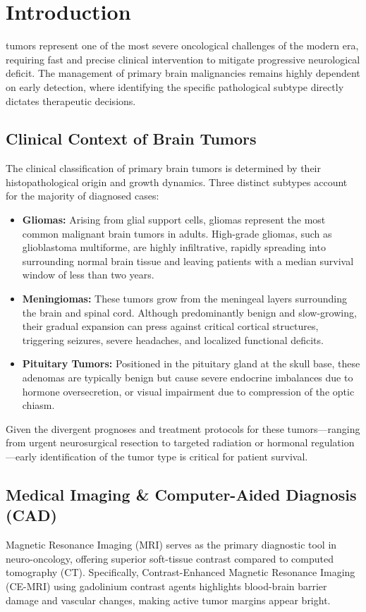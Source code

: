 \documentclass[journal,twoside]{IEEEtran}
\begin{document}
\IEEEpeerreviewmaketitle

\section{Introduction}
 tumors represent one of the most severe oncological challenges of the modern era, requiring fast and precise clinical intervention to mitigate progressive neurological deficit. The management of primary brain malignancies remains highly dependent on early detection, where identifying the specific pathological subtype directly dictates therapeutic decisions. 

\subsection{Clinical Context of Brain Tumors}
The clinical classification of primary brain tumors is determined by their histopathological origin and growth dynamics. Three distinct subtypes account for the majority of diagnosed cases:
\begin{itemize}
    \item \textbf{Gliomas:} Arising from glial support cells, gliomas represent the most common malignant brain tumors in adults. High-grade gliomas, such as glioblastoma multiforme, are highly infiltrative, rapidly spreading into surrounding normal brain tissue and leaving patients with a median survival window of less than two years.
    \item \textbf{Meningiomas:} These tumors grow from the meningeal layers surrounding the brain and spinal cord. Although predominantly benign and slow-growing, their gradual expansion can press against critical cortical structures, triggering seizures, severe headaches, and localized functional deficits.
    \item \textbf{Pituitary Tumors:} Positioned in the pituitary gland at the skull base, these adenomas are typically benign but cause severe endocrine imbalances due to hormone oversecretion, or visual impairment due to compression of the optic chiasm.
\end{itemize}
Given the divergent prognoses and treatment protocols for these tumors—ranging from urgent neurosurgical resection to targeted radiation or hormonal regulation—early identification of the tumor type is critical for patient survival.

\subsection{Medical Imaging \& Computer-Aided Diagnosis (CAD)}
Magnetic Resonance Imaging (MRI) serves as the primary diagnostic tool in neuro-oncology, offering superior soft-tissue contrast compared to computed tomography (CT). Specifically, Contrast-Enhanced Magnetic Resonance Imaging (CE-MRI) using gadolinium contrast agents highlights blood-brain barrier damage and vascular changes, making active tumor margins appear bright.
\end{document}
